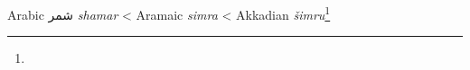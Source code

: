 \begin{etymology}\label{ety:shamra}
Arabic { شمر} \textit{shamar}
< Aramaic \textit{simra}
< Akkadian {} \textit{šimru}\footnote{}
\end{etymology}